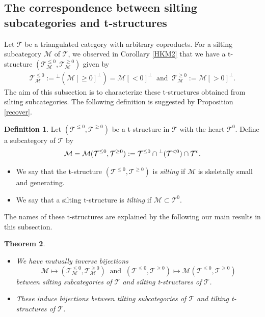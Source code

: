 \documentclass[a4paper,reqno]{amsart}
\newtheorem{theorem}{Theorem}[section]
\theoremstyle{definition}
\newtheorem{definition}[theorem]{Definition}
\newcommand{\TT}{{\mathcal T}}
\newcommand{\MM}{{\mathcal M}}
\begin{document}
\subsection{The correspondence between silting subcategories and t-structures}\label{The correspondence between silting subcategories and t-structures}

Let $\TT$ be a triangulated category with arbitrary coproducts.
For a silting subcategory $\MM$ of $\TT$, we observed in Corollary \ref{HKM2} that we have a t-structure 
$(\TT_{\MM}^{\le0},\TT_{\MM}^{\ge0})$ given by
\begin{eqnarray*}
\TT_{\MM}^{\le0}:={}^\perp(\MM[\ge0]^\perp)=\MM[<0]^\perp\ \mbox{ and }\ \TT_{\MM}^{\ge0}:=\MM[>0]^\perp.
\end{eqnarray*}
The aim of this subsection is to characterize these t-structures obtained from silting subcategories.
The following definition is suggested by Proposition \ref{recover}.

\begin{definition}
Let $(\TT^{\le0},\TT^{\ge0})$ be a t-structure in $\TT$ with the heart $\TT^0$.
Define a subcategory of $\TT$ by
\[\MM=\MM(\TT^{\le0},\TT^{\ge0}):=\TT^{\le0}\cap{}^\perp(\TT^{<0})\cap\TT^{\rm c}.\]
\begin{itemize}
\item[(a)] We say that the t-structure $(\TT^{\le0},\TT^{\ge0})$ is \emph{silting} if $\MM$ is skeletally small and generating.
\item[(b)] We say that a silting t-structure is \emph{tilting} if $\MM\subset\TT^0$.
\end{itemize}
\end{definition}

The names of these t-structures are explained by the following our main results in this subsection.

\begin{theorem}\label{correspondence}
\begin{itemize}
\item[(a)] We have mutually inverse bijections 
\[\MM\mapsto(\TT_{\MM}^{\le0},\TT_{\MM}^{\ge0})\ \mbox{ and }\ (\TT^{\le0},\TT^{\ge0})\mapsto\MM(\TT^{\le0},\TT^{\ge0})\]
between silting subcategories of $\TT$ and silting t-structures of $\TT$.
\item[(b)] These induce bijections between tilting subcategories of $\TT$ and tilting t-structures of $\TT$.
\end{itemize}
\end{theorem}
\end{document}

